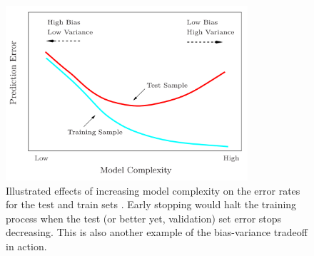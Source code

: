 \begin{figure}
\centering
\includegraphics[width=0.8\textwidth]{figures/ml/test_train_err_curves.png}
\caption{
Illustrated effects of increasing model complexity on the error rates for the test and train sets \cite{HastieTF09}.
Early stopping would halt the training process when the test (or better yet, validation) set error stops decreasing.
This is also another example of the bias-variance tradeoff in action.
}
\label{fig:ml:supervised:early_stopping}
\end{figure}
